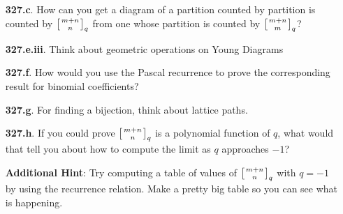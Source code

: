 \documentclass[10pt,]{book}
\theoremstyle{plain}
\theoremstyle{definition}
\theoremstyle{definition}
\theoremstyle{definition}
\numberwithin{equation}{chapter}
\newcommand{\qchoose}[2]{\left[{#1\atop#2}\right]_q}
\begin{document}
\begin{itemize}[itemsep=1em]
\item[\textbf{327.c}.]\hypertarget{p-1621}{}%
How can you get a diagram of a partition counted by partition is counted by \(\qchoose{m+n}{n}\) from one whose partition is counted by \(\qchoose{m+n}{m}\)?%

\item[\textbf{327.e.iii}.]\hypertarget{p-1633}{}%
Think about geometric operations on Young Diagrams%

\item[\textbf{327.f}.]\hypertarget{p-1636}{}%
How would you use the Pascal recurrence to prove the corresponding result for binomial coefficients?%

\item[\textbf{327.g}.]\hypertarget{p-1640}{}%
For finding a bijection, think about lattice paths.%

\item[\textbf{327.h}.]\hypertarget{p-1643}{}%
If you could prove \(\qchoose{m+n}{n}\) is a polynomial function of \(q\), what would that tell you about how to compute the limit as \(q\) approaches \(-1\)?%

\par\smallskip
\noindent\textbf{Additional Hint}: \hypertarget{p-1644}{}%
Try computing a table of values of \(\qchoose{m+n}{n}\) with \(q=-1\) by using the recurrence relation. Make a pretty big table so you can see what is happening.%

\end{itemize}
\typeout{************************************************}
\typeout{************************************************}
\end{document}
